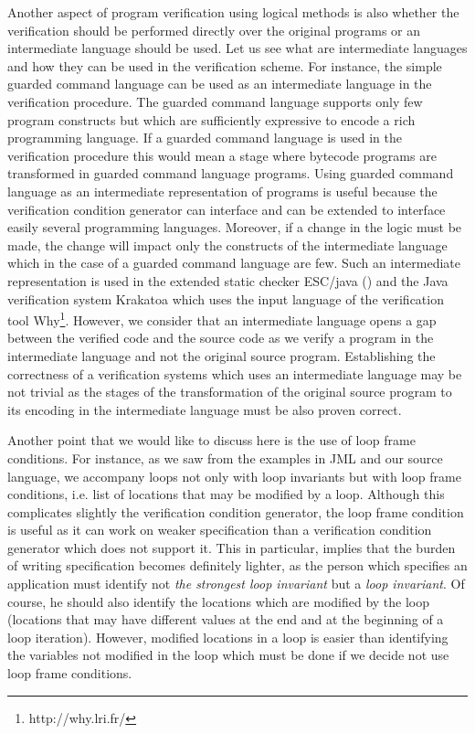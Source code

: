 Another aspect of program verification using logical methods is also whether the verification should be performed directly over the original programs
or  an intermediate language should be used. Let us see what are intermediate languages and how they can be used in the verification scheme.
For instance, the simple guarded command language can be used as an intermediate language in the verification procedure.
 The guarded command   language supports  only few program constructs but which are 
sufficiently expressive to encode a rich programming language. 
If a guarded command language is used in the verification procedure this would mean 
a stage where  bytecode programs are transformed in guarded command language programs.
Using guarded command language as an intermediate representation of programs
is useful because the verification condition generator can interface and can be extended to interface 
easily several programming languages. Moreover, if a change in the logic must be made, the change will impact only
 the constructs of the intermediate language which in the case of a guarded command language are few.
Such an intermediate representation is used in the extended static checker
ESC/java (\cite{escjava}) and the Java verification system Krakatoa \cite{marche03krakatoa} which uses the input language of the verification tool Why\footnote{http://why.lri.fr/}.
However, we consider that an intermediate language 
opens a gap between  the verified code and the source code as we verify  a program in the intermediate language and not the original source program.
Establishing the correctness of a verification systems which uses an intermediate language
may be not trivial as the stages of the transformation of the original source program to its encoding in the intermediate language must be also proven correct. 

Another point that we would like to discuss here is the use of loop frame conditions. 
For instance, as  we saw from the examples in JML and our source language, we accompany loops not only with 
loop invariants but with loop frame conditions, i.e. list of locations that may be modified by a loop.
Although this complicates slightly the verification condition generator, the loop frame condition is useful as it can work 
on weaker specification than a verification condition generator which does not support it. This in particular, implies that the burden of writing specification 
becomes definitely lighter, as the person which specifies an application must identify not  \textit{the strongest loop invariant }
but a \textit{loop invariant}. Of course, he should also identify  the locations which are modified by the loop (locations that may have different values 
at the end and at the beginning of a loop iteration). However, modified locations in a loop is easier than identifying the variables not modified in the loop which 
must be done if we decide not use loop frame conditions. 

